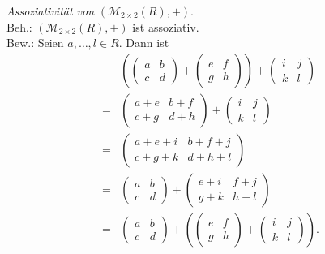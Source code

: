 \documentclass[12pt,a4paper]{article}
\begin{document}
\begin{enumerate}[(a)]
    \textit{Assoziativität von} $(\mathcal{M}_{2\times2}(R), +)$.\\
    Beh.: $(\mathcal{M}_{2\times2}(R), +)$ ist assoziativ.\\
    Bew.: Seien $a,\dots,l \in R$.
    Dann ist
    \begin{align*}
    &\left(\begin{pmatrix}
    a & b\\ c & d
    \end{pmatrix} + \begin{pmatrix}
    e & f\\ g & h
    \end{pmatrix}\right) + \begin{pmatrix}
    i & j\\ k & l
    \end{pmatrix}\\
    = &\begin{pmatrix}
    a+e & b+f\\ c+g & d+h
    \end{pmatrix} + \begin{pmatrix}
    i & j\\ k & l
    \end{pmatrix}\\
    = &\begin{pmatrix}
    a+e+i & b+f+j\\ c+g+k & d+h+l
    \end{pmatrix}\\
    = &\begin{pmatrix}
    a & b\\ c & d
    \end{pmatrix} + \begin{pmatrix}
    e+i & f+j\\ g+k & h+l
    \end{pmatrix}\\
    = &\begin{pmatrix}
    a & b\\ c & d
    \end{pmatrix} + \left(\begin{pmatrix}
    e & f\\ g & h
    \end{pmatrix} + \begin{pmatrix}
    i & j\\ k & l
    \end{pmatrix}\right).
    \end{align*}


\end{enumerate}
\end{document}
